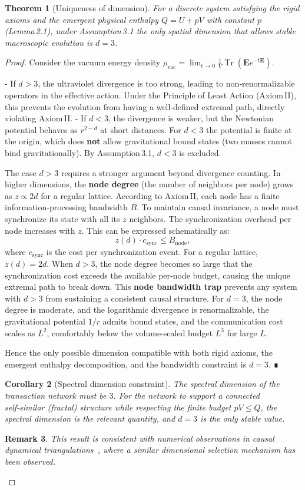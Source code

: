 \documentclass{article}
\newtheorem{theorem}{Theorem}[section]
\newtheorem{remark}[theorem]{Remark}
\newtheorem{corollary}[theorem]{Corollary}
\begin{document}
\begin{theorem}[Uniqueness of dimension]
For a discrete system satisfying the rigid axioms and the emergent physical enthalpy $Q = U + pV$ with constant $p$ (Lemma 2.1), under Assumption 3.1 the only spatial dimension that allows stable macroscopic evolution is $d=3$.
\end{theorem}
\begin{proof}
Consider the vacuum energy density $\rho_{\text{vac}} = \lim_{t\to0} \frac{1}{V}\operatorname{Tr}(\mathbf{E}e^{-t\mathbf{E}})$.

- If $d>3$, the ultraviolet divergence is too strong, leading to non‑renormalizable operators in the effective action. Under the Principle of Least Action (Axiom II), this prevents the evolution from having a well‑defined extremal path, directly violating Axiom II.
- If $d<3$, the divergence is weaker, but the Newtonian potential behaves as $r^{2-d}$ at short distances. For $d<3$ the potential is finite at the origin, which does \textbf{not} allow gravitational bound states (two masses cannot bind gravitationally). By Assumption 3.1, $d<3$ is excluded.

The case $d>3$ requires a stronger argument beyond divergence counting. In higher dimensions, the \textbf{node degree} (the number of neighbors per node) grows as $z \propto 2d$ for a regular lattice. According to Axiom II, each node has a finite information‑processing bandwidth $B$. To maintain causal invariance, a node must synchronize its state with all its $z$ neighbors. The synchronization overhead per node increases with $z$. This can be expressed schematically as:
\[
z(d) \cdot c_{\text{sync}} \le B_{\text{node}},
\]
where $c_{\text{sync}}$ is the cost per synchronization event. For a regular lattice, $z(d) = 2d$. When $d > 3$, the node degree becomes so large that the synchronization cost exceeds the available per‑node budget, causing the unique extremal path to break down. This \textbf{node bandwidth trap} prevents any system with $d > 3$ from sustaining a consistent causal structure. For $d=3$, the node degree is moderate, and the logarithmic divergence is renormalizable, the gravitational potential $1/r$ admits bound states, and the communication cost scales as $L^2$, comfortably below the volume‑scaled budget $L^3$ for large $L$.

Hence the only possible dimension compatible with both rigid axioms, the emergent enthalpy decomposition, and the bandwidth constraint is $d=3$. ∎

\begin{corollary}[Spectral dimension constraint]
The spectral dimension of the transaction network must be $3$. For the network to support a connected self‑similar (fractal) structure while respecting the finite budget $pV \le Q$, the spectral dimension is the relevant quantity, and $d=3$ is the only stable value.
\end{corollary}
\begin{remark}
This result is consistent with numerical observations in causal dynamical triangulations~\cite{ambjorn}, where a similar dimensional selection mechanism has been observed.
\end{remark}


\end{proof}
\end{document}
